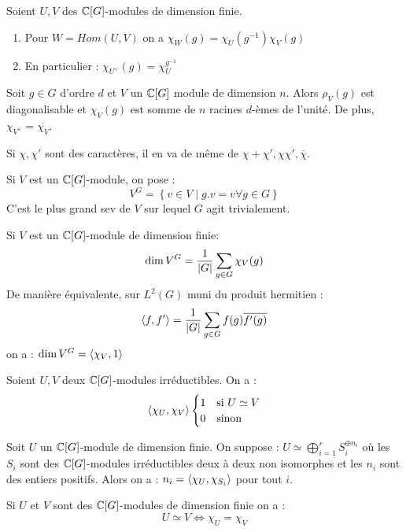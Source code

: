 \documentclass{cours}
\begin{document}
\begin{proposition}
    Soient $U, V$ des $\mathbb{C}[G]$-modules de dimension finie. 
    \begin{enumerate}
        \item Pour $W = Hom(U, V)$ on a $\chi_{W}(g) = \chi_{U}(g^{-1})\chi_{V}(g)$
        \item En particulier : $\chi_{U^{\lor}}(g) = \chi_{U}^{g^{-1}}$
    \end{enumerate}
\end{proposition}
\begin{proposition}
    Soit $g \in G$ d'ordre $d$ et $V$ un $\mathbb{C}[G]$ module de dimension $n$. Alors $\rho_{V}(g)$ est diagonalisable et $\chi_{V}(g)$ est somme de $n$ racines $d$-èmes de l'unité. De plus, $\chi_{V^{\lor}} = \overline{\chi_{V}}$.
\end{proposition}

\begin{corollary}
    Si $\chi, \chi'$ sont des caractères, il en va de même de $\chi + \chi', \chi\chi', \overline{\chi}$. 
\end{corollary}

\begin{definition}
    Si $V$ est un $\mathbb{C}[G]$-module, on pose : 
    \[
        V^{G} = \left\{v\in V \mid g.v = v \forall g \in G\right\}
    \]
    C'est le plus grand sev de $V$ sur lequel $G$ agit trivialement. 
\end{definition}

\begin{lemma}
    Si $V$ est un $\mathbb{C}[G]$-module de dimension finie: 
    \[
        \dim V^{G} = \frac{1}{\left|G\right|} \sum_{g \in G}\chi_{V}(g)
    \]
    De manière équivalente, sur $L^{2}(G)$ muni du produit hermitien : 
    \[
        \left\langle f, f' \right\rangle = \frac{1}{\left|G\right|}\sum_{g \in G}f(g)\overline{f'(g)}
    \]
    on a : $\dim V^{G} = \left\langle \chi_{V}, 1 \right\rangle$
\end{lemma}

\begin{theorem}
    Soient $U, V$ deux $\mathbb{C}[G]$-modules irréductibles. On a :
    \[
        \left\langle \chi_{U}, \chi_{V} \right\rangle \begin{cases}
            1 & \text{si } U \simeq V\\
            0 & \text{sinon}
        \end{cases}
    \]
\end{theorem}
\begin{corollary}
    Soit $U$ un $\mathbb{C}[G]$-module de dimension finie. On suppose : $U \simeq \bigoplus_{i = 1}^{r} S_{i}^{\oplus n_{i}}$
    où les $S_{i}$ sont des $\mathbb{C}[G]$-modules irréductibles deux à deux non isomorphes et les $n_{i}$ sont des entiers positifs.
    Alors on a : $n_{i} = \left\langle \chi_{U}, \chi_{S_{i}} \right\rangle$ pour tout $i$. 
\end{corollary}
\begin{corollary}
    Si $U$ et $V$ sont des $\mathbb{C}[G]$-modules de dimension finie on a : 
    \[
        U \simeq V \Longleftrightarrow \chi_{U} = \chi_{V}
    \]
\end{corollary}
\end{document}
